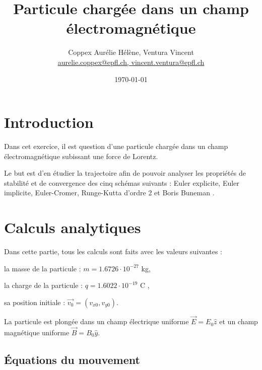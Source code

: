 \documentclass[a4paper,12pt,twoside]{article}
\newcommand{\mail}[1]{{\href{mailto:#1}{#1}}}
\begin{document}
	\title{Particule charg\'ee dans un champ \'electromagn\'etique}
	\author{Coppex Aur\'elie H\'el\`ene, Ventura Vincent\\  %
	{\small \mail{aurelie.coppex@epfl.ch, vincent.ventura@epfl.ch}}}
	\date{\today}\maketitle
	\tableofcontents %




\section{Introduction} %

	Dans cet exercice, il est question d'une particule charg\'ee dans un champ \'electromagn\'etique subissant une force de Lorentz. 
	
	Le but est d'en \'etudier la trajectoire afin de pouvoir analyser les propri\'et\'es de stabilit\'e et de convergence des cinq sch\'emas suivants : 
	Euler explicite, Euler implicite, Euler-Cromer, Runge-Kutta d'ordre 2 et Boris Buneman \cite{NdC}.
	\newpage

\section{Calculs analytiques}

	Dans cette partie, tous les calculs sont faits avec les valeurs suivantes :
	
	la masse de la particule : $m = 1.6726 \cdot 10^{-27}$ kg, 
	
	la charge de la particule :	$q = 1.6022 \cdot 10^{-19}$ C ,
	
	sa position initiale : $\vec{v_0} = (v_{x0}, v_{y0})$.
	
	La particule est plongée dans un champ \'electrique uniforme $\vec{E} = E_0 \hat{z}$ et un champ magn\'etique uniforme $\vec{B} = B_0 \hat{y}$.


	\subsection{\'Equations du mouvement}
	
\end{document}
